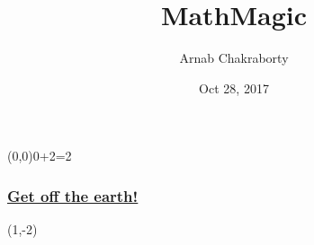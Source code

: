 




\title[]{MathMagic}
\author[]{Arnab Chakraborty}
\date{Oct 28, 2017}



\large\bf




\begin{frame}\begin{textblock}{1}(0,0)0+2=2\end{textblock}\frametitle{{\color{red}\underline{\Large\bf
}}}\frametitle{\underline{\Large\bf
Get off the earth!}}
\begin{textblock}{10}(1,-2)%
\end{textblock}
\end{frame}
